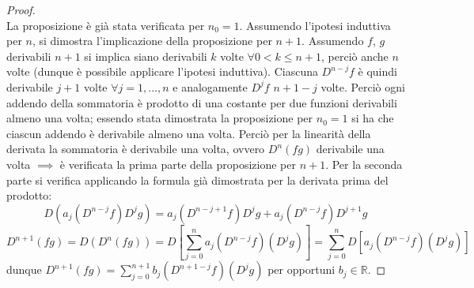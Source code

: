 \documentclass[10pt]{article}
\theoremstyle{plain}
\begin{document}
\begin{proof}
\\La proposizione è già stata verificata per $n_0 = 1$. Assumendo l'ipotesi induttiva per $n$, si dimostra l'implicazione della proposizione per $n+1$. Assumendo $f$, $g$ derivabili $n+1$ si implica siano derivabili $k$ volte $\forall 0 < k \leq n+1$, perciò anche $n$ volte (dunque è possibile applicare l'ipotesi induttiva). Ciascuna $D^{n-j}f$ è quindi derivabile $j+1$ volte $\forall j = 1, ..., n$ e analogamente $D^{j}f$ $n+1-j$ volte. Perciò ogni addendo della sommatoria è prodotto di una costante per due funzioni derivabili almeno una volta; essendo stata dimostrata la proposizione per $n_0 = 1$ si ha che ciascun addendo è derivabile almeno una volta. Perciò per la linearità della derivata la sommatoria è derivabile una volta, ovvero $D^n(fg)$ derivabile una volta $\implies$ è verificata la prima parte della proposizione per $n+1$. Per la seconda parte si verifica applicando la formula già dimostrata per la derivata prima del prodotto:
\[D(a_j(D^{n-j}f)D^jg) = a_j(D^{n-j+1}f)D^jg + a_j(D^{n-j}f)D^{j+1}g\]
\[D^{n+1}(fg) = D(D^n(fg)) = D [\sum \limits_{j=0}^{n} a_j (D^{n-j}f)(D^jg)] = \sum \limits_{j=0}^{n} D[ a_j (D^{n-j}f)(D^jg)]\]
dunque $D^{n+1}(fg) = \sum \limits_{j=0}^{n+1} b_j (D^{n+1-j}f)(D^jg)$ per opportuni $b_j \in \mathbb{R}$.
\end{proof}
\end{document}
